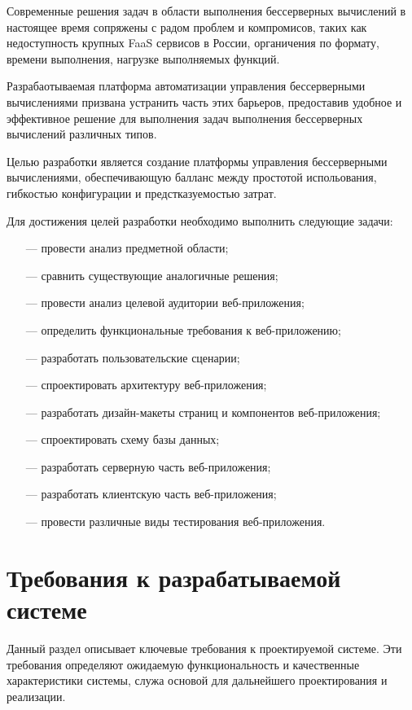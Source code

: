 Современные решения задач в области выполнения бессерверных вычислений в настоящее время сопряжены с радом проблем и компромисов, таких как недоступность крупных FaaS сервисов в России, органичения по формату, времени выполнения, нагрузке выполняемых функций. 

Разрабаотываемая платформа автоматизации управления бессерверными вычислениями призвана устранить часть этих барьеров, предоставив удобное и эффективное решение для выполнения задач выполнения бессерверных вычислений различных типов.

Целью разработки является создание платформы управления бессерверными вычислениями, обеспечивающую балланс между простотой испольования, гибкостью конфигурации и предстказуемостью затрат.

Для достижения целей разработки необходимо выполнить следующие задачи:

\begin{itemize}
    \item[---]провести анализ предметной области;
    \item[---]сравнить существующие аналогичные решения;
    \item[---]провести анализ целевой аудитории веб-приложения;
    \item[---]определить функциональные требования к веб-приложению;
    \item[---]разработать пользовательские сценарии;
    \item[---]спроектировать архитектуру веб-приложения;
    \item[---]разработать дизайн-макеты страниц и компонентов веб-приложения;
    \item[---]спроектировать схему базы данных;
    \item[---]разработать серверную часть веб-приложения;
    \item[---]разработать клиентскую часть веб-приложения;
    \item[---]провести различные виды тестирования веб-приложения.
\end{itemize}

\section{Требования к разрабатываемой системе}

Данный раздел описывает ключевые требования к проектируемой системе. Эти требования определяют ожидаемую функциональность и качественные характеристики системы, служа основой для дальнейшего проектирования и реализации. 

